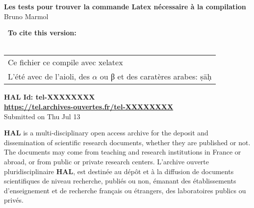 \documentclass[11pt,a4paper]{article}
\begin{document}
\vspace*{\fill}
\begin{center}
\vspace*{2cm}
\begin{doublespace}
{\LARGE \textbf{Les tests pour trouver la commande Latex nécessaire à la compilation}} \\
{\Large Bruno Marmol}
\end{doublespace}
\end{center}
{\Large \textbf{~To cite this version:}} \\\\
\begin{tabular}{|p{\textwidth}}
{\large Ce fichier ce compile avec xelatex} \\
{\large L'été avec de l'aioli, des $\alpha$ ou β et des caratères arabes: ṣāḥ } \\
\end{tabular}
\vspace*{1cm}
\begin{center}
\begin{doublespace}
{\Large \textbf{HAL Id: tel-XXXXXXXX}} \\
{\Large \textbf{\url{https://tel.archives-ouvertes.fr/tel-XXXXXXXX}}} \\
Submitted on Thu Jul 13 
\end{doublespace}
\end{center}
\vspace*{1cm}
\begin{multicols}{2}
\textbf{HAL} is a multi-disciplinary open access archive for the deposit and dissemination of scientific research documents, whether they are published or not. The documents may come from teaching and research institutions in France or abroad, or from public or private research centers.
\vfill
\columnbreak
L'archive ouverte pluridisciplinaire \textbf{HAL}, est destinée au dépôt et à la diffusion de documents scientifiques de niveau recherche, publiés ou non, émanant des établissements d'enseignement et de recherche français ou étrangers, des laboratoires publics ou privés.
\end{multicols}
\vspace{1cm}
\begin{center}
\end{center}
\vspace*{\fill}
\end{document}
